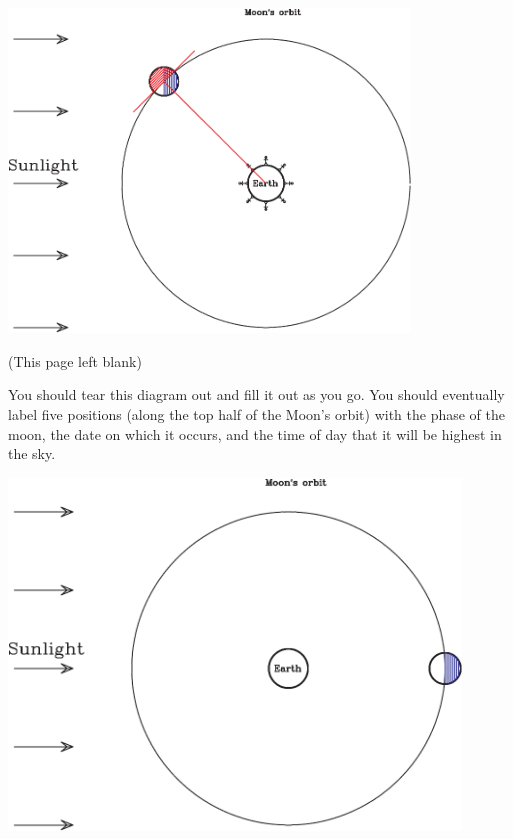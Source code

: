 \documentclass[11pt]{article}
\begin{document}
\begin{center}
	\includegraphics[width=0.8\textwidth]{allpositions-crop.pdf}
\end{center}

\newpage
\begin{center}
(This page left blank)
\end{center}

\newpage

You should tear this diagram out and fill it out as you go. You should eventually label five positions (along the top half of the Moon's orbit)
with the phase of the moon, the date on which it occurs, and the time of day that it will be highest in the sky.

\includegraphics[width=0.9\textwidth]{moon-diagram-full-shade-crop.pdf}
\end{document}
